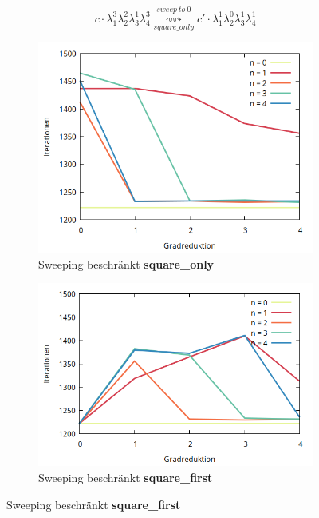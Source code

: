 $$ c \cdot \lambda_1^3 \lambda_2^2 \lambda_3^1 \lambda_4^3  \underset{square\_only}{\overset{sweep\ to\ 0}{\rightsquigarrow}} c' \cdot \lambda_1^1 \lambda_2^0 \lambda_3^1 \lambda_4^1$$



\begin{figure}[tbh]
\centering
\begin{subfigure}{.5\textwidth}
  \centering
  \includegraphics[width=\linewidth]{img/sweeping_only.png}  
  \caption{Sweeping beschränkt \textbf{square\_only}}
  \label{fig:sub1}
\end{subfigure}%
\begin{subfigure}{.5\textwidth}
  \centering
  \includegraphics[width=\linewidth]{img/sweeping_first.png}
 \caption{Sweeping beschränkt \textbf{square\_first}}
  \label{fig:sub2}
\end{subfigure}


\end{figure}
